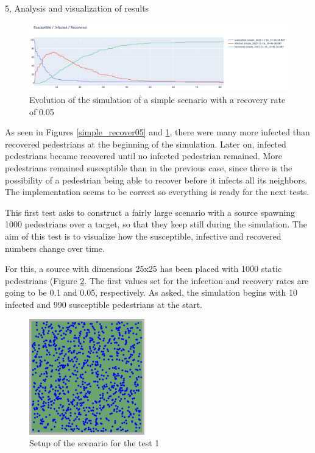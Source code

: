 \documentclass[10pt,a4paper]{article}
\begin{document}
\begin{task}{5, Analysis and visualization of results}
\begin{figure} [H]
    \includegraphics[width=15cm]{images/evolution05.png}
    \centering
    \caption{Evolution of the simulation of a simple scenario with a recovery rate of 0.05}
    \label{evolution05}
\end{figure}

As seen in Figures \ref{simple_recover05} and \ref{evolution05}, there were many more infected than recovered pedestrians at the beginning of the simulation. Later on, infected pedestrians became recovered until no infected pedestrian remained. More pedestrians remained susceptible than in the previous case, since there is the possibility of a pedestrian being able to recover before it infects all its neighbors. The implementation seems to be correct so everything is ready for the next tests.

\newpage


This first test asks to construct a fairly large scenario with a source spawning 1000 pedestrians over a target, so that they keep still during the simulation. The aim of this test is to visualize how the susceptible, infective and recovered numbers change over time.

For this, a source with dimensions 25x25 has been placed with 1000 static pedestrians (Figure \ref{test1_scenario}. The first values set for the infection and recovery rates are going to be 0.1 and 0.05, respectively. As asked, the simulation begins with 10 infected and 990 susceptible pedestrians at the start.

\begin{figure} [H]
    \includegraphics[width=5cm]{images/test1_scenario.png}
    \centering
    \caption{Setup of the scenario for the test 1}
    \label{test1_scenario}
\end{figure}


\end{task}
\end{document}
